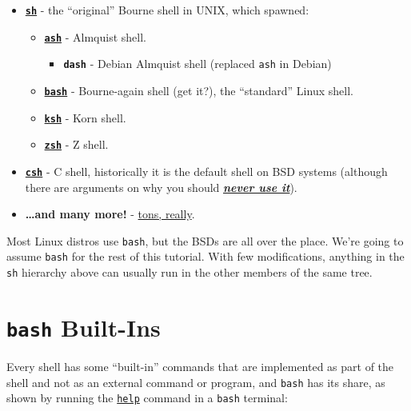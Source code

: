 \documentclass[10pt,]{book}
\numberwithin{figure}{chapter}
\begin{document}
\begin{itemize}
\item
  \href{https://en.wikipedia.org/wiki/Bourne_shell}{\textbf{\texttt{sh}}}
  - the ``original'' Bourne shell in UNIX, which spawned:

  \begin{itemize}
  \item
    \href{https://en.wikipedia.org/wiki/Almquist_shell}{\textbf{\texttt{ash}}}
    - Almquist shell.

    \begin{itemize}
    \itemsep1pt\parskip0pt
    \item
      \textbf{\texttt{dash}} - Debian Almquist shell (replaced
      \texttt{ash} in Debian)
    \end{itemize}
  \item
    \href{https://en.wikipedia.org/wiki/Bash_\%28Unix_shell\%29}{\textbf{\texttt{bash}}}
    - Bourne-again shell (get it?), the ``standard'' Linux shell.
  \item
    \href{https://en.wikipedia.org/wiki/Korn_shell}{\textbf{\texttt{ksh}}}
    - Korn shell.
  \item
    \href{https://en.wikipedia.org/wiki/Z_shell}{\textbf{\texttt{zsh}}}
    - Z shell.
  \end{itemize}
\item
  \href{https://en.wikipedia.org/wiki/C_shell}{\textbf{\texttt{csh}}} -
  C shell, historically it is the default shell on BSD systems (although
  there are arguments on why you should
  \href{http://www.faqs.org/faqs/unix-faq/shell/csh-whynot/}{\textbf{\emph{never
  use it}}}).
\item
  \textbf{\ldots{}and many more!} -
  \href{https://en.wikipedia.org/wiki/Unix_shell\#Shell_categories}{tons,
  really}.
\end{itemize}

Most Linux distros use \texttt{bash}, but the BSDs are all over the
place. We're going to assume \texttt{bash} for the rest of this
tutorial. With few modifications, anything in the \texttt{sh} hierarchy
above can usually run in the other members of the same tree.

\section{\texttt{bash} Built-Ins}\label{bash-built-ins}

Every shell has some ``built-in'' commands that are implemented as part
of the shell and not as an external command or program, and
\texttt{bash} has its share, as shown by running the
\href{http://linux.die.net/man/1/help}{\texttt{help}} command in a
\texttt{bash} terminal:
\end{document}
